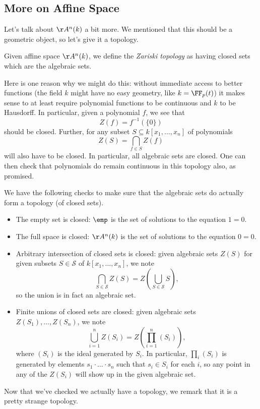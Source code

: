 \documentclass[../notes.tex]{subfiles}
\begin{document}
\subsection{More on Affine Space}
Let's talk about $\AA^n(k)$ a bit more. We mentioned that this should be a geometric object, so let's give it a topology.
\begin{definition}
	Given affine space $\AA^n(k)$, we define the \textit{Zariski topology} as having closed sets which are the algebraic sets.
\end{definition}
\begin{remark}[Nir]
	Here is one reason why we might do this: without immediate access to better functions (the field $k$ might have no easy geometry, like $k=\FF_p(t)$) it makes sense to at least require polynomial functions to be continuous and $k$ to be Hausdorff. In particular, given a polynomial $f$, we see that
	\[Z(f)=f^{-1}(\{0\})\]
	should be closed. Further, for any subset $S\subseteq k[x_1,\ldots,x_n]$ of polynomials
	\[Z(S)=\bigcap_{f\in S}Z(f)\]
	will also have to be closed. In particular, all algebraic sets are closed. One can then check that polynomials do remain continuous in this topology also, as promised.
\end{remark}
We have the following checks to make sure that the algebraic sets do actually form a topology (of closed sets).
\begin{itemize}
	\item The empty set is closed: $\emp$ is the set of solutions to the equation $1=0$.
	\item The full space is closed: $\AA^n(k)$ is the set of solutions to the equation $0=0$.
	\item Arbitrary intersection of closed sets is closed: given algebraic sets $Z(S)$ for given subsets $S\in\mathcal S$ of $k[x_1,\ldots,x_n]$, we note
	\[\bigcap_{S\in\mathcal S}Z(S)=Z\left(\bigcup_{S\in\mathcal S}S\right),\]
	so the union is in fact an algebraic set.
	\item Finite unions of closed sets are closed: given algebraic sets $Z(S_1),\ldots,Z(S_n)$, we note
	\[\bigcup_{i=1}^nZ(S_i)=Z\left(\prod_{i=1}^n(S_i)\right),\]
	where $(S_i)$ is the ideal generated by $S_i$. In particular, $\prod_i(S_i)$ is generated by elements $s_1\cdot\ldots\cdot s_n$ such that $s_i\in S_i$ for each $i$, so any point in any of the $Z(S_i)$ will show up in the given algebraic set.
\end{itemize}
Now that we've checked we actually have a topology, we remark that it is a pretty strange topology.
\end{document}
